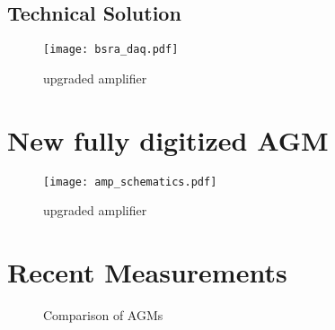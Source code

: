\subsection{Technical Solution}

        \begin{figure}[!tbh]
            \centering
            \texttt{[image: bsra\_daq.pdf]}
            \caption{upgraded amplifier}
            \label{fig:amplifier}
        \end{figure}


\section{New fully digitized AGM}

        \begin{figure}[!tbh]
            \centering
            \texttt{[image: amp\_schematics.pdf]}
            \caption{upgraded amplifier}
            \label{fig:amplifier}
        \end{figure}

%      

\section{Recent Measurements}

    \begin{figure}[!htb]
      \begin{center}
          \scalebox{0.54}{}
          \caption{Comparison of AGMs}
          \label{fig:comparison_chart}
      \end{center}
    \end{figure}

